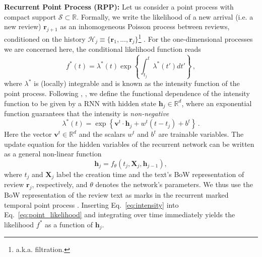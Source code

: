 \documentclass[letterpaper]{article} %
\newcommand{\+}[1]{\boldsymbol{\mathbf{#1}}}
\newcommand*{\Eqref}[1]{Eq.~\eqref{#1}}
\def\*#1{\mathbf{#1}}
\begin{document}
\textbf{Recurrent Point Process (RPP):}
\label{ssec:RMPP}
Let us consider a point process with compact support $\mathcal{S} \subset \mathbb{R}$. Formally, we write the likelihood of a new arrival (i.e. a new review) $\*r_{j+1}$ as an inhomogeneous Poisson process between reviews, conditioned on the history $\mathcal{H}_j \equiv  \{\*r_1,...,\*r_j\}$\footnote{a.k.a. filtration.} \cite{VereJones}. 
%
For the one-dimensional processes we are concerned here, the conditional likelihood function reads
\begin{equation}
f^*(t) = \lambda^*(t) \exp\left\{ \int^{t}_{t_j}\lambda^*\left(t'\right)dt' \right\}\, ,
\label{eq:point_likelihood}
\end{equation}
where $\lambda^*$ is (locally) integrable and is known as the intensity function of the point process.
%
Following \cite{NeuralHawkes}, \cite{RecurrentTemporal}, we define the functional dependence of the intensity function to be given by a RNN with hidden state $\*h_j \in \mathbb{R}^d$, where an exponential function guarantees that the intensity is \textit{non-negative}
\begin{equation}
\lambda^*(t) = \exp{\left\{\*v^t\cdot\*h_j + w^t\left(t-t_j\right) + b^t\right\}} \label{eq:intensity}\, .
\end{equation}
Here the vector $\*v^t \in \mathbb{R}^d$ and the scalars $w^t$ and $b^t$ are trainable variables. The update equation for the hidden variables of the recurrent network can be written as a general non-linear function 
\begin{equation}
\*h_j = f_{\theta}(t_{j}, \*X_j, \*h_{j-1}),
\label{eq:transitionfunction}
\end{equation}
where $t_j$ and $\*X_j$ label the creation time and the text's BoW representation of review $\*r_j$, respectively, and $\theta$ denotes the network's parameters. We thus use the BoW representation of the review text as marks in the recurrent marked temporal point process \cite{du2016recurrent}. Inserting \Eqref{eq:intensity} into \Eqref{eq:point_likelihood} and integrating over time immediately yields the likelihood $f^*$ as a function of $\*h_j$. 
\end{document}
